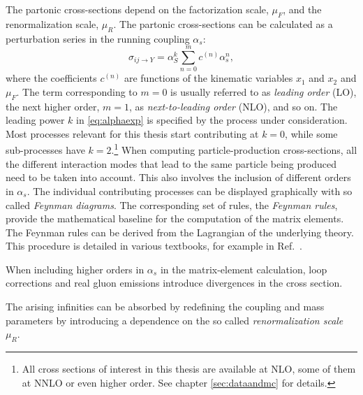 The partonic cross-sections depend on the factorization scale, $\mu_F$, and the renormalization scale, $\mu_R$. 
The partonic cross-sections can be calculated as a perturbation series in the running coupling $\alpha_s$:
\begin{equation}
  \hat{\sigma}_{ij \rightarrow Y} = \alpha^k_S \sum_{n=0}^{m} c^{(n)}\alpha_s^n,
  \label{eq:alphaexp}
\end{equation}
where the coefficients $c^{(n)}$ are functions of the kinematic variables $x_1$ and $x_2$ and $\mu_F$. The term corresponding to $m=0$ is usually referred to as \emph{leading order} (LO), the next higher order, $m=1$, as \emph{next-to-leading order} (NLO), and so on.
The leading power $k$ in \cref{eq:alphaexp} is specified by the process under consideration. Most processes relevant for this thesis start contributing at $k=0$, while some sub-processes have $k=2$.\footnote{All cross sections of interest in this thesis are available at NLO, some of them at NNLO or even higher order. See chapter \cref{sec:dataandmc} for details.}
When computing particle-production cross-sections, all the different interaction modes that lead to the same particle being produced need to be taken into account. This also involves the inclusion of different orders in $\alpha_s$.
The individual contributing processes can be displayed graphically with so called \emph{Feynman diagrams}. The corresponding set of rules, the \emph{Feynman rules}, provide the mathematical baseline for the computation of the matrix elements. The Feynman rules can be derived from the Lagrangian of the underlying theory.
This procedure is detailed in various textbooks, for example in Ref.~\cite{Griffiths:111880}.

When including higher orders in $\alpha_s$ in the matrix-element calculation, loop corrections and real gluon emissions introduce divergences in the cross section. %

The arising infinities can be absorbed by redefining the coupling and mass parameters by introducing a dependence on the so called \emph{renormalization scale} $\mu_R$.

